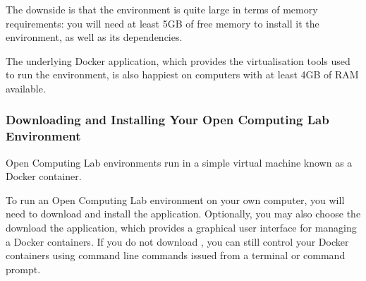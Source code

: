 \documentclass[letterpaper,10pt,english]{sphinxmanual}
\begin{document}
The downside is that the environment is quite large in terms of memory requirements: you will need at least 5GB of free memory to install it the environment, as well as its dependencies.

The underlying Docker application, which provides the virtualisation tools used to run the environment, is also happiest on computers with at least 4GB of RAM available.


\subsubsection{Downloading and Installing Your Open Computing Lab Environment}
\label{\detokenize{content/00_READ_ME_FIRST/Section_00_05_Accessing_RoboLab:Downloading-and-Installing-Your-Open-Computing-Lab-Environment}}
Open Computing Lab environments run in a simple virtual machine known as a Docker container.

To run an Open Computing Lab environment on your own computer, you will need to download and install the  application. Optionally, you may also choose the download the  application, which provides a graphical user interface for managing a Docker containers. If you do not download , you can still control your Docker containers using command line commands issued from a terminal or command prompt.
\end{document}
